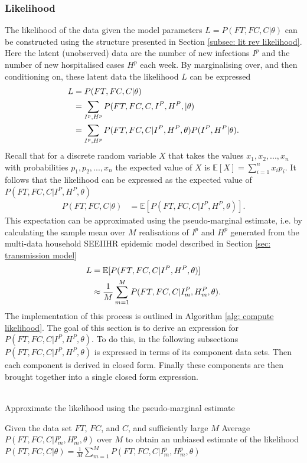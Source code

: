 \subsubsection{Likelihood}
The likelihood of the data given the model parameters $L = P(FT, FC, C | \theta)$ can be constructed using the structure presented in Section \ref{subsec: lit rev likelihood}. Here the latent (unobserved) data are the number of new infections $I^p$ and the number of new hospitalised cases $H^p$ each week. By marginalising over, and then conditioning on, these latent data the likelihood $L$ can be expressed
\begin{align} \label{Param est: likelihood as expectation} \notag
L &= P(FT, FC, C | \theta) \\ \notag
&= \sum_{I^p, H^p} P(FT, FC, C, I^P, H^P, | \theta) \\
&= \sum_{I^p, H^p} P(FT, FC, C| I^P, H^P, \theta) P( I^P, H^P |\theta).
\end{align}
Recall that for a discrete random variable $X$ that takes the values $x_1, x_2,..., x_n$ with probabilities $p_1, p_2,..., x_n$ the expected value of $X$ is $\mathbb{E}[X] = \sum_{i=1}^n x_i p_i$. It follows that the likelihood can be expressed as the expected value of $P(FT, FC, C| I^P, H^P, \theta) $
\begin{align}
P(FT, FC, C | \theta) &= \mathbb{E}[ P(FT, FC, C| I^P, H^P, \theta) ].
\end{align}
This expectation can be approximated using the pseudo-marginal estimate, i.e. by calculating the sample mean over $M$ realisations of $I^p$ and $H^p$ generated from the multi-data household SEEIIHR epidemic model described in Section \ref{sec: transmission model}
\begin{align} \notag \label{eqn: posterior as average}
	L &= \mathbb{E}[ P(FT, FC, C| I^P, H^P, \theta) ]\\
	&\approx \frac{1}{M} \sum_{m=1}^{M} P(FT, FC, C| I_m^P, H_m^P, \theta).
\end{align}
The implementation of this process is outlined in Algorithm \ref{alg: compute likelihood}.
The goal of this section is to derive an expression for $P(FT, FC, C| I^P, H^P, \theta)$. To do this, in the following subsections $P(FT, FC, C| I^P, H^P, \theta)$ is expressed in terms of its component data sets. Then each component is derived in closed form. Finally these components are then brought together into a single closed form expression. \\ \\
\begin{algorithm}[H]
	\caption{Approximate the likelihood using the pseudo-marginal estimate} \label{alg: compute likelihood}
	\SetAlgoLined
	Given the data set $FT$, $FC$, and $C$, and sufficiently large $M$\;
	Average $P(FT, FC, C | I_m^p, H_m^p, \theta)$ over $M$ to obtain an unbiased estimate of the likelihood $P(FT, FC, C | \theta) = \frac{1}{M} \sum_{m=1}^{M} P(FT, FC, C | I_m^p, H_m^p, \theta)$
\end{algorithm}

